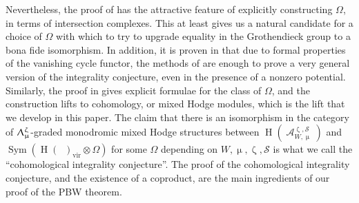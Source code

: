 \documentclass[a4paper,10pt]{amsart}
\renewcommand{\zeta}{\upzeta}
\renewcommand{\Lambda}{\Uplambda}
\renewcommand{\mu}{\upmu}
\DeclareMathOperator{\BC}{B\mathbb{C}^*}
\newcommand{\SP}{\mathcal{S}}
\DeclareMathOperator{\Sym}{Sym}
\DeclareMathOperator{\vir}{vir}
\DeclareMathOperator{\HO}{H}
\DeclareMathOperator{\Coha}{\mathcal{A}}
\begin{document}
\smallbreak
Nevertheless, the proof of \cite{Meinhardt14} has the attractive feature of explicitly constructing $\Omega$, in terms of intersection complexes.  This at least gives us a natural candidate for a choice of $\Omega$ with which to try to upgrade equality in the Grothendieck group to a bona fide isomorphism.  In addition, it is proven in \cite{DaMe4} that due to formal properties of the vanishing cycle functor, the methods of \cite{Meinhardt14} are enough to prove a very general version of the integrality conjecture, even in the presence of a nonzero potential.  Similarly, the proof in \cite{DaMe4} gives explicit formulae for the class of $\Omega$, and the construction lifts to cohomology, or mixed Hodge modules, which is the lift that we develop in this paper.  The claim that there is an isomorphism in the category of $\Lambda_{\mu}^{\zeta}$-graded monodromic mixed Hodge structures between $\HO(\Coha_{W,\mu}^{\zeta,\SP})$ and $\Sym\left(\HO(\BC)_{\vir}\otimes\Omega\right)$ for some $\Omega$ depending on $W,\mu,\zeta,\SP$ is what we call the ``cohomological integrality conjecture''.  The proof of the cohomological integrality conjecture, and the existence of a coproduct, are the main ingredients of our proof of the PBW theorem.
\end{document}
